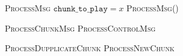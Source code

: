 \documentclass{article}
\begin{document}
\pagestyle{empty}

\newcommand{\send}{\Rightarrow}
\newcommand{\sendto}{\rightarrow}
\algrenewcommand{}


  


\begin{algorithmic}
  \State \textsc{ProcessMsg}
  \State $\mathtt{chunk\_to\_play} = x$
  \State \textsc{ProcessMsg}()
  \EndWhile
  \EndProcedure  
\end{algorithmic}

\begin{algorithmic}
  \State \textsc{ProcessChunkMsg}
  \Else
  \State \textsc{ProcessControlMsg}
  \EndIf
  \EndProcedure  
\end{algorithmic}

\begin{algorithmic}
  \State \textsc{ProcessDupplicateChunk}
  \Else
  \State \textsc{ProcessNewChunk}
  \EndIf
  \EndProcedure  
\end{algorithmic}
\end{document}
